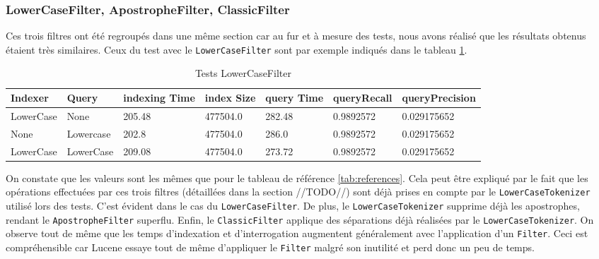 \subsubsection{LowerCaseFilter, ApostropheFilter, ClassicFilter}

Ces trois filtres ont été regroupés dans une même section car au fur et à mesure des tests, nous avons réalisé que les résultats obtenus étaient très similaires. Ceux du test avec le \texttt{LowerCaseFilter} sont par exemple indiqués dans le tableau \ref{tab:tests_LowerCaseFilter}.

\begin{table}[!htbp]
    \hspace{-2cm}
                \begin{tabular}{|p{2cm}|p{2cm}|p{2cm}|p{2cm}|p{2.5cm}|p{2.5cm}|p{2.5cm}|}
                    \hline
                    \textbf{Indexer} & \textbf{Query} & \textbf{indexing Time} & \textbf{index Size} & \textbf{query Time} & \textbf{queryRecall} & \textbf{queryPrecision}\\
                    \hline
LowerCase & None & 205.48 & 477504.0 & 282.48 & 0.9892572 & 0.029175652\\
		\hline
None & Lowercase & 202.8 & 477504.0 & 286.0 & 0.9892572 & 0.029175652\\
		\hline
LowerCase & LowerCase & 209.08 & 477504.0 & 273.72 & 0.9892572 & 0.029175652\\
                    \hline
                \end{tabular}
                \caption{Tests LowerCaseFilter}
                \label{tab:tests_LowerCaseFilter}
            \end{table}

On constate que les valeurs sont les mêmes que pour le tableau de référence \ref{tab:references}. Cela peut être expliqué par le fait que les opérations effectuées par ces trois filtres (détaillées dans la section //TODO//) sont déjà prises en compte par le \texttt{LowerCaseTokenizer} utilisé lors des tests. C’est évident dans le cas du \texttt{LowerCaseFilter}. De plus, le \texttt{LowerCaseTokenizer} supprime déjà les apostrophes, rendant le \texttt{ApostropheFilter} superflu. Enfin, le \texttt{ClassicFilter} applique des séparations déjà réalisées par le \texttt{LowerCaseTokenizer}. On observe tout de même que les temps d’indexation et d’interrogation augmentent généralement  avec l’application d’un \texttt{Filter}. Ceci est compréhensible car Lucene essaye tout de même d’appliquer le \texttt{Filter} malgré son inutilité et perd donc un peu de temps.

